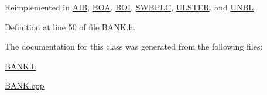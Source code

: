 Reimplemented in \hyperlink{class_a_i_b_afe4e3c7b481bf87437968dde2cc75882}{A\+IB}, \hyperlink{class_b_o_a_a7ea44308c05532cd11ff3ce8f14ea4c2}{B\+OA}, \hyperlink{class_b_o_i_a663906e9a59ffa970fb928746c01e8af}{B\+OI}, \hyperlink{class_s_w_b_p_l_c_aa5581ea5d2e0315b816876737e887f09}{S\+W\+B\+P\+LC}, \hyperlink{class_u_l_s_t_e_r_ab2fec6b440c29b1953296ad23d4b432c}{U\+L\+S\+T\+ER}, and \hyperlink{class_u_n_b_l_abd683db339dffe71af3993a8a5cb5929}{U\+N\+BL}.



Definition at line 50 of file B\+A\+N\+K.\+h.



The documentation for this class was generated from the following files\+:\begin{DoxyCompactItemize}
\item 
\hyperlink{_b_a_n_k_8h}{B\+A\+N\+K.\+h}\item 
\hyperlink{_b_a_n_k_8cpp}{B\+A\+N\+K.\+cpp}\end{DoxyCompactItemize}
